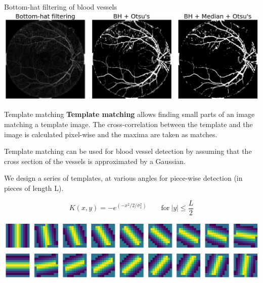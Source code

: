 \documentclass[9pt, aspectratio=169]{beamer}
\begin{document}
\begin{frame}
    {Bottom-hat filtering of blood vessels}
    \centering
    \includegraphics[width=\textwidth]{retina_bottomhat.png}
\end{frame}
\begin{frame}
    {Template matching}
    \textbf{Template matching} allows finding small parts of an image matching a template image. The cross-correlation between the template and the image is calculated pixel-wise and the maxima are taken as matches.


    \pause
    Template matching can be used for blood vessel detection by assuming that the cross section of the vessels is approximated by a Gaussian.

    \pause
    We design a series of templates, at various angles for piece-wise detection (in pieces of length L).

    $$K(x, y) = - e^(-x^2/2/\sigma_x^2)\qquad \text{for}~|y| \leq \frac{L}{2}$$

    \centering
    \includegraphics[width=.9\textwidth]{template_matching_kernels.png}
\end{frame}
\end{document}
